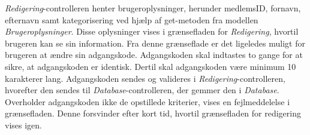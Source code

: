\noindent
\textit{Redigering}-controlleren henter brugeroplysninger, herunder medlemsID, fornavn, efternavn samt kategorisering ved hjælp af get-metoden fra modellen \textit{Brugeroplysninger}. Disse oplysninger vises i grænsefladen for \textit{Redigering}, hvortil brugeren kan se sin information. Fra denne grænseflade er det ligeledes muligt for brugeren at ændre sin adgangskode. Adgangskoden skal indtastes to gange for at sikre, at adgangskoden er identisk. Dertil skal adgangskoden være minimum 10 karakterer lang. Adgangskoden sendes og valideres i \textit{Redigering}-controlleren, hvorefter den sendes til \textit{Database}-controlleren, der gemmer den i \textit{Database}. Overholder adgangskoden ikke de opstillede kriterier, vises en fejlmeddelelse i grænsefladen. Denne forsvinder efter kort tid, hvortil grænsefladen for redigering vises igen. 
